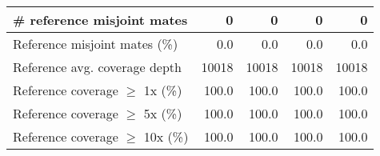 \documentclass[12pt,a4paper]{article}
\begin{document}
\begin{table}[ht]
\begin{center}
\begin{tabular}{|l*{4}{|r}|}
\# reference misjoint mates & 0 & 0 & 0 & 0 \\ \hline
Reference misjoint mates (\%) & 0.0 & 0.0 & 0.0 & 0.0 \\ \hline
Reference avg. coverage depth & 10018 & 10018 & 10018 & 10018 \\ \hline
Reference coverage $\geq$ 1x (\%) & 100.0 & 100.0 & 100.0 & 100.0 \\ \hline
Reference coverage $\geq$ 5x (\%) & 100.0 & 100.0 & 100.0 & 100.0 \\ \hline
Reference coverage $\geq$ 10x (\%) & 100.0 & 100.0 & 100.0 & 100.0 \\ \hline
\end{tabular}
\end{center}
\end{table}
\end{document}
